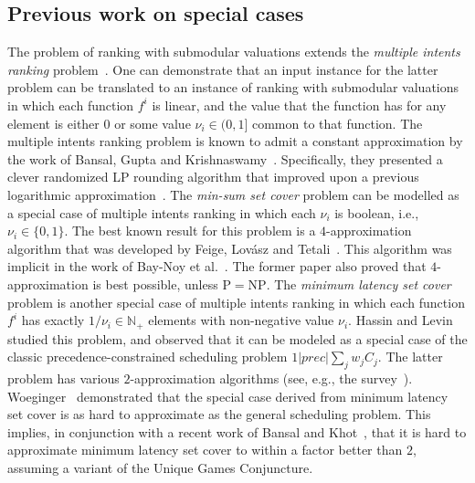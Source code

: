 \documentclass[11pt]{article}
\theoremstyle{plain}
\theoremstyle{definition}
\newcommand{\bbN}{\mathbb{N}}
\begin{document}
\subsection{Previous work on special cases}

The problem of ranking with submodular valuations extends the
\emph{multiple intents ranking} problem~\cite{AzarGY09}. One can
demonstrate that an input instance for the latter problem can be
translated to an instance of ranking with submodular valuations in
which each function $f^i$ is linear, and the value that the
function has for any element is either $0$ or some value $\nu_i
\in (0,1]$ common to that function. The multiple intents ranking
problem is known to admit a constant approximation by the work of
Bansal, Gupta and Krishnaswamy~\cite{BansalGK10}. Specifically,
they presented a clever randomized LP rounding algorithm that
improved upon a previous logarithmic
approximation~\cite{AzarGY09}. The \emph{min-sum set cover}
problem can be modelled as a special case of multiple intents
ranking in which each $\nu_i$ is boolean, i.e., $\nu_i \in
\{0,1\}$. The best known result for this problem is a
$4$-approximation algorithm that was developed by Feige,
Lov{\'a}sz and Tetali~\cite{FeigeLT04}. This algorithm was
implicit in the work of Bay-Noy et al.~\cite{Bar-NoyBHST98}. The
former paper also proved that $4$-approximation is best possible,
unless $\mathrm{P} = \mathrm{NP}$. The \emph{minimum latency set
cover} problem is another special case of multiple intents ranking
in which each function $f^i$ has exactly $1 / \nu_i \in \bbN_+$
elements with non-negative value $\nu_i$. Hassin and
Levin~\cite{HassinL05} studied this problem, and observed that it
can be modeled as a special case of the classic
precedence-constrained scheduling problem $1|prec|\sum_j w_j C_j$.
The latter problem has various $2$-approximation algorithms (see,
e.g., the survey~\cite{ChekuriK04}). Woeginger~\cite{Woeginger03}
demonstrated that the special case derived from minimum latency
set cover is as hard to approximate as the general scheduling
problem. This implies, in conjunction with a recent work of Bansal
and Khot~\cite{BansalK09}, that it is hard to approximate minimum
latency set cover to within a factor better than $2$, assuming a
variant of the Unique Games Conjuncture.
\end{document}
